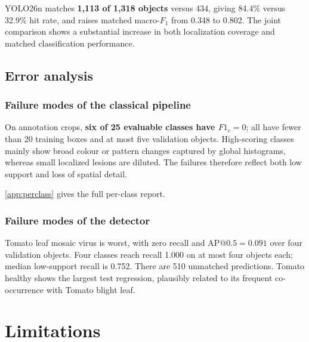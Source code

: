 \documentclass[a4paper,8pt]{article}
\begin{document}
YOLO26n matches \textbf{1,113 of 1,318 objects} versus 434, giving 84.4\% versus 32.9\% hit rate,
and raises matched macro-$F_1$ from 0.348 to 0.802. The joint comparison shows a substantial
increase in both localization coverage and matched classification performance.

\subsection{Error analysis}
\label{sec:error-analysis}

\subsubsection{Failure modes of the classical pipeline}

On annotation crops, \textbf{six of 25 evaluable classes have $F1_c=0$}; all have fewer than 20
training boxes and at most five validation objects. High-scoring classes mainly show broad colour
or pattern changes captured by global histograms, whereas small localized lesions are diluted.
The failures therefore reflect both low support and loss of spatial detail.

\ref{app:perclass} gives the full per-class report.

\subsubsection{Failure modes of the detector}

Tomato leaf mosaic virus is worst, with zero recall and $\mathrm{AP}@0.5=0.091$ over four
validation objects. Four classes reach recall 1.000 on at most four objects each; median
low-support recall is 0.752. There are 510 unmatched predictions. Tomato healthy shows the largest test
regression, plausibly related to its frequent co-occurrence with Tomato blight leaf.

\section{Limitations}
\label{sec:limitations}
\end{document}
